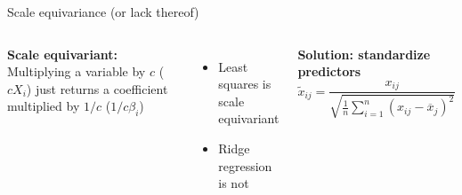 \documentclass[aspectratio=169,usenames,dvipsnames]{beamer}
\newcommand{\InstructorList}[1]{
\begin{itemize}
	\color{orange}
	#1
\end{itemize}
}
\renewcommand{\InstructorList}[1]{}
\begin{document}
\begin{frame}[t]{Scale equivariance (or lack thereof)}

\begin{columns}
\centering
\textbf{Scale equivariant:} Multiplying a variable by $c$ ($cX_i$) just returns a coefficient multiplied by $1/c$ ($1/c \beta_i$)

\vspace{1in}
\begin{itemize}
	\item Least squares is scale equivariant 
	\item Ridge regression is not
\end{itemize}

\textbf{Solution: standardize predictors}
\begin{equation*}
	\widetilde x_{ij} = \frac{x_{ij}}{
	\sqrt{ \tfrac{1}{n} \sum_{i=1}^n (x_{ij}-\overline x_j)^2}
	}
\end{equation*}
\centering
\InstructorList{
\item Ex: \texttt{income variable}. If you put in income by \$1,000's of dollars, the answer you would get is quite different. Might emphasize a different coefficient. 
\item Least squares is scale equivariant
\item Ridge regression very much is not
\item $X_j\hat \beta_{j,\lambda}^R$ depends not only on $\lambda$ but also on values of other predictors
}
\end{columns}

\end{frame}



\end{document}
